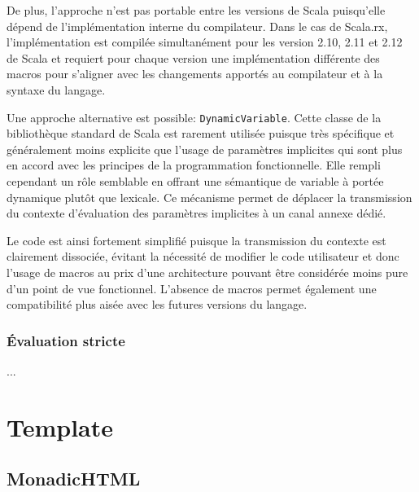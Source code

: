 De plus, l'approche n'est pas portable entre les versions de Scala puisqu'elle dépend de l'implémentation interne du compilateur. Dans le cas de Scala.rx, l'implémentation est compilée simultanément pour les version 2.10, 2.11 et 2.12 de Scala et requiert pour chaque version une implémentation différente des macros pour s'aligner avec les changements apportés au compilateur et à la syntaxe du langage.

Une approche alternative est possible: \texttt{DynamicVariable}. Cette classe de la bibliothèque standard de Scala est rarement utilisée puisque très spécifique et généralement moins explicite que l'usage de paramètres implicites qui sont plus en accord avec les principes de la programmation fonctionnelle. Elle rempli cependant un rôle semblable en offrant une sémantique de variable à portée dynamique plutôt que lexicale. Ce mécanisme permet de déplacer la transmission du contexte d'évaluation des paramètres implicites à un canal annexe dédié.

Le code est ainsi fortement simplifié puisque la transmission du contexte est clairement dissociée, évitant la nécessité de modifier le code utilisateur et donc l'usage de macros au prix d'une architecture pouvant être considérée moins pure d'un point de vue fonctionnel. L'absence de macros permet également une compatibilité plus aisée avec les futures versions du langage.

\subsubsection{Évaluation stricte}

...

\section{Template}
\subsection{MonadicHTML}
